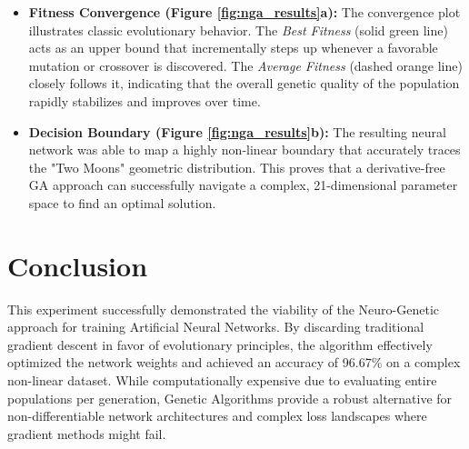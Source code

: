 \documentclass[11pt]{article}
\begin{document}
\begin{itemize}
    \item \textbf{Fitness Convergence (Figure \ref{fig:nga_results}a):} The convergence plot illustrates classic evolutionary behavior. The \textit{Best Fitness} (solid green line) acts as an upper bound that incrementally steps up whenever a favorable mutation or crossover is discovered. The \textit{Average Fitness} (dashed orange line) closely follows it, indicating that the overall genetic quality of the population rapidly stabilizes and improves over time.
    \item \textbf{Decision Boundary (Figure \ref{fig:nga_results}b):} The resulting neural network was able to map a highly non-linear boundary that accurately traces the "Two Moons" geometric distribution. This proves that a derivative-free GA approach can successfully navigate a complex, 21-dimensional parameter space to find an optimal solution.
\end{itemize}

\section{Conclusion}
This experiment successfully demonstrated the viability of the Neuro-Genetic approach for training Artificial Neural Networks. By discarding traditional gradient descent in favor of evolutionary principles, the algorithm effectively optimized the network weights and achieved an accuracy of 96.67\% on a complex non-linear dataset. While computationally expensive due to evaluating entire populations per generation, Genetic Algorithms provide a robust alternative for non-differentiable network architectures and complex loss landscapes where gradient methods might fail.


\renewcommand{\bibname}{References}

\end{document}
